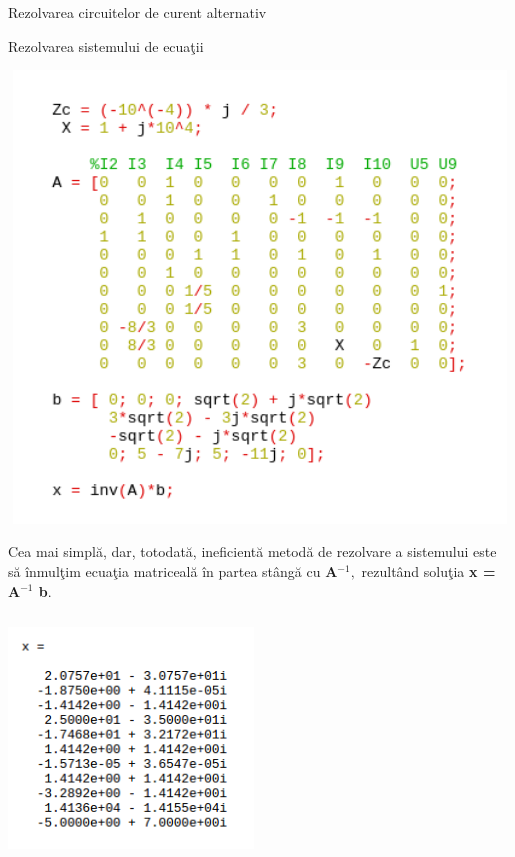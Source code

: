 \documentclass[a4paper]{article}
\begin{document}
\begin{section}{Rezolvarea circuitelor de curent alternativ}
\begin{subsection}{Rezolvarea sistemului de ecua\c tii \\}
\begin{itemize}
	\includegraphics[width=14cm, height=12cm]{octave1.png}

	Cea mai simpl\u a, dar, totodat\u a, ineficient\u a metod\u a de rezolvare a sistemului este s\u a \^ inmul\c tim ecua\c tia matriceal\u a \^ in partea st\^ ang\u a cu \textbf{A$^{-1}, $} rezult\^ and solu\c tia \textbf{x = A$^{-1} $ b}.

	\includegraphics[width=6.5cm, height=6.5cm]{octave2.png}


\end{itemize} \par

\end{subsection}



\end{section}
\end{document}
